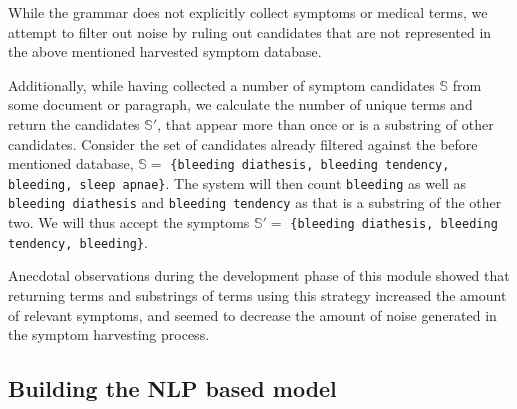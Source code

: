 \documentclass[10pt,letterpaper,final]{article}
\begin{document}
While the grammar does not explicitly collect symptoms or medical terms,
we attempt to filter out noise by ruling out candidates that are not
represented in the above mentioned harvested symptom database.

Additionally, while having collected a number of symptom candidates
$\mathbb{S}$ from some document or paragraph, we calculate the number of
unique terms and return the candidates $\mathbb{S'}$, that appear more
than once or is a substring of other candidates. Consider the set of
candidates already filtered against the before mentioned database,
$\mathbb{S} = $ \texttt{\{bleeding diathesis, bleeding tendency,
bleeding, sleep apnae\}}. The system will then count \texttt{bleeding}
as well as \texttt{bleeding diathesis} and \texttt{bleeding tendency} as
that is a substring of the other two. We will thus accept the symptoms
$\mathbb{S'} = $ \texttt{\{bleeding diathesis, bleeding tendency,
bleeding\}}.


Anecdotal observations during the development phase of this module
showed that returning terms and substrings of terms using this strategy
increased the amount of relevant symptoms, and seemed to decrease the
amount of noise generated in the symptom harvesting process.

\subsection{Building the NLP based model}



\end{document}
